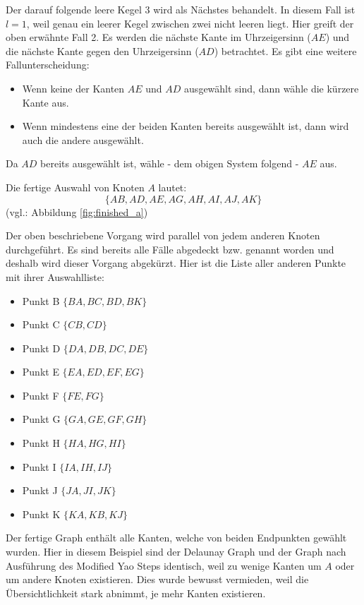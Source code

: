 \documentclass[a4paper,twoside]{IEEEtran}
\begin{document}
Der darauf folgende leere Kegel $3 $ wird als Nächstes behandelt.
In diesem Fall ist $l=1 $, weil genau ein leerer Kegel zwischen zwei nicht leeren liegt.
Hier greift der oben erwähnte Fall 2.
Es werden die nächste Kante im Uhrzeigersinn ($AE $) und die nächste Kante gegen den Uhrzeigersinn ($AD $) betrachtet.
Es gibt eine weitere Fallunterscheidung:
\begin{itemize}
\item Wenn keine der Kanten $AE $ und $AD $ ausgewählt sind, dann wähle die kürzere Kante aus.
\item Wenn mindestens eine der beiden Kanten bereits ausgewählt ist, dann wird auch die andere ausgewählt.
\end{itemize}
Da $AD $ bereits ausgewählt ist, wähle - dem obigen System folgend - $AE $ aus.

Die fertige Auswahl von Knoten $A $ lautet:
\begin{equation*}
\{AB, AD, AE, AG, AH, AI, AJ, AK\}
\end{equation*}
(vgl.: Abbildung \ref{fig:finished_a})


Der oben beschriebene Vorgang wird parallel von jedem anderen Knoten durchgeführt.
Es sind bereits alle Fälle abgedeckt bzw. genannt worden und deshalb wird dieser Vorgang abgekürzt.
Hier ist die Liste aller anderen Punkte mit ihrer Auswahlliste:
\begin{itemize}
\item Punkt B $\{BA, BC, BD, BK\}$
\item Punkt C $\{CB, CD\}$
\item Punkt D $\{DA, DB, DC, DE\}$
\item Punkt E $\{EA, ED, EF, EG\}$
\item Punkt F $\{FE, FG\}$
\item Punkt G $\{GA, GE, GF, GH\}$
\item Punkt H $\{HA, HG, HI\}$
\item Punkt I $\{IA, IH, IJ\}$
\item Punkt J $\{JA, JI, JK\}$
\item Punkt K $\{KA, KB, KJ\}$
\end{itemize}

Der fertige Graph enthält alle Kanten, welche von beiden Endpunkten gewählt wurden.
Hier in diesem Beispiel sind der Delaunay Graph und der Graph nach Ausführung des Modified Yao Steps identisch, weil zu wenige Kanten um $A $ oder um andere Knoten existieren.
Dies wurde bewusst vermieden, weil die Übersichtlichkeit stark abnimmt, je mehr Kanten existieren.
\end{document}
